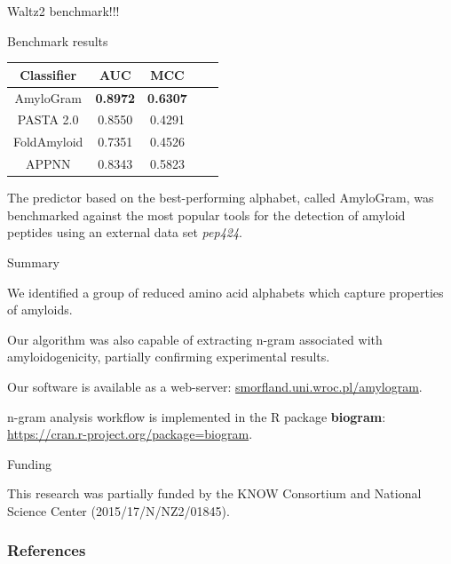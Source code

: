 \documentclass{beamer}\usepackage[]{graphicx}\usepackage[]{color}
\begin{document}
\begin{frame}
Waltz2 benchmark!!!\end{frame}

\begin{frame}{Benchmark results}

\begin{table}[ht]
\centering

\begin{tabular}{ccccc}
  \toprule
Classifier & AUC & MCC \\ 
  \midrule
AmyloGram & \textbf{0.8972} & \textbf{0.6307} \\ 
  \rowcolor{white}PASTA 2.0 \citep{walsh_pasta_2014} & 0.8550 & 0.4291  \\ 
   FoldAmyloid \citep{garbuzynskiy_foldamyloid:_2010} & 0.7351 & 0.4526  \\ 
  \rowcolor{white}APPNN \citep{familia_prediction_2015} & 0.8343 & 0.5823  \\ 
   \bottomrule
\end{tabular}
\end{table}

The predictor based on the best-performing alphabet, called AmyloGram, was benchmarked against the most popular tools for the detection of amyloid peptides using an external data set \textit{pep424}.

\end{frame}

\begin{frame}{Summary}

We identified a group of reduced amino acid alphabets which capture properties of amyloids. 

Our algorithm was also capable of extracting n-gram associated with amyloidogenicity, partially confirming experimental results.

Our software is available as a web-server: \url{smorfland.uni.wroc.pl/amylogram}.

n-gram analysis workflow is implemented in the R package \textbf{biogram}: \url{https://cran.r-project.org/package=biogram}.

\end{frame}

\begin{frame}{Funding}

This research was partially funded by the KNOW Consortium and National Science Center (2015/17/N/NZ2/01845).

\end{frame}



\begin{frame}[allowframebreaks]
        \frametitle{References}
  
  
\end{frame}  
\end{document}
